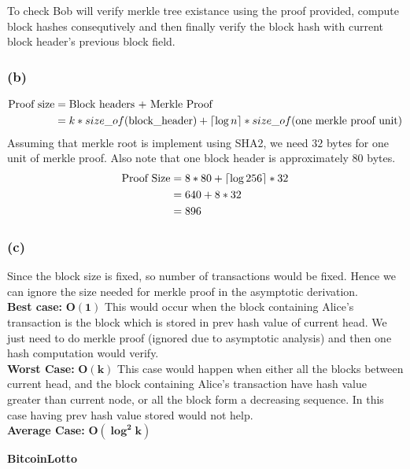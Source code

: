 \documentclass[a4paper]{article}
\DeclarePairedDelimiter{\ceil}{\lceil}{\rceil}
\begin{document}
To check Bob will verify merkle tree existance using the proof provided, compute block hashes consequtively
and then finally verify the block hash with current block header's previous block field.

\subsubsection*{(b)}
\begin{align*}
   \text{Proof size} &= \text{Block headers +  Merkle Proof} \\
    &= k*size\_of(\text{block\_header}) + \ceil{\log n}*size\_of(\text{one merkle proof unit})
\end{align*}
Assuming that merkle root is implement using SHA2, we need $32$ bytes for one unit of merkle proof.
Also note that one block header is approximately $80$ bytes.
\begin{align*}
    \text{Proof Size} &= 8*80 + \ceil{\log 256}*32 \\
                      &= 640 + 8*32 \\
                      &= 896
\end{align*}

\subsubsection*{(c)}
Since the block size is fixed, so number of transactions would be fixed. Hence we can ignore the size
needed for merkle proof in the asymptotic derivation. \\

\textbf{Best case:} $\mathbf{O(1)}$ This would occur when the block containing Alice's transaction
is the block which is stored in prev hash value of current head. We just need to do merkle proof (ignored due to asymptotic analysis)
and then one hash computation would verify. \\

\textbf{Worst Case:} $\mathbf{O(k)}$ This case would happen when either all the blocks between current head,
    and the block containing Alice's transaction have hash value greater than current node, or all the block
    form a decreasing sequence. In this case having prev hash value stored would not help. \\
    
\textbf{Average Case:} $\mathbf{O(\log^2 k)}$
\begin{question}
    \textbf{BitcoinLotto}
\end{question}
\end{document}

